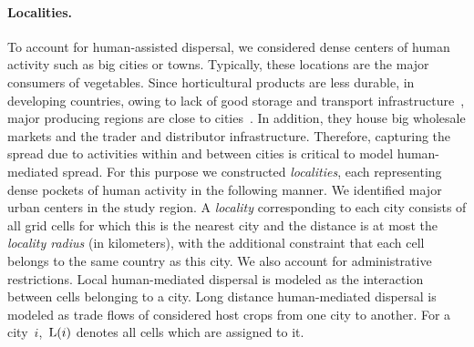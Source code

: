 \documentclass[11pt]{article}
\newcommand{\aacomment}[1]{({\color{magenta}AA: #1})}
\theoremstyle{definition}
\begin{document}
\paragraph{Localities.} To account for human-assisted dispersal, we
considered dense centers of human activity such as big cities or towns.
Typically, these locations are the major consumers of vegetables. Since
horticultural products are less durable, in developing countries, owing to
lack of good storage and transport infrastructure~\cite{ali2001}, major
producing regions are close to cities~\cite{buckmaster2014going}. In
addition, they house big wholesale markets and the trader and distributor
infrastructure. Therefore, capturing the spread due to activities within
and between cities is critical to model human-mediated spread. For this
purpose we constructed \emph{localities}, each representing dense pockets
of human activity in the following manner.  We identified major urban
centers in the study region. A \emph{locality} corresponding to each city
consists of all grid cells for which this is the nearest city and the
distance is at most the \emph{locality radius} (in kilometers), with the
additional constraint that each cell belongs to the same country as this
city. We also account for administrative restrictions. Local human-mediated
dispersal is modeled as the interaction between cells belonging to a city.
Long distance human-mediated dispersal is modeled as trade flows of
considered host crops from one city to another. For a
city~$i$,~$\mathrm{L}(i)$ denotes all cells which are assigned to it.
\end{document}
